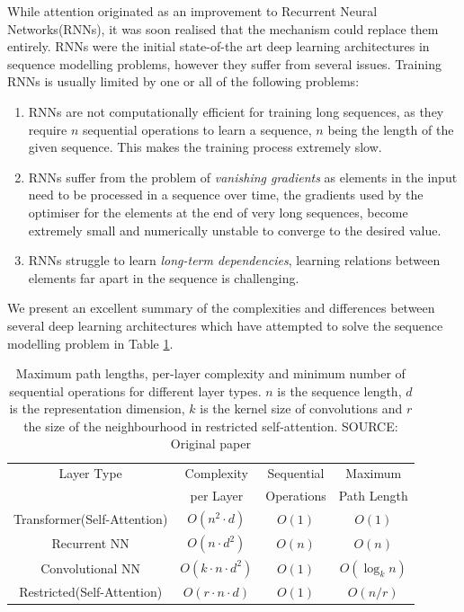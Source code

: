 While attention originated as an improvement to Recurrent Neural Networks(RNNs), it was soon realised that the mechanism could replace them entirely.\cite{vaswaniAttentionAllYou2017}
RNNs were the initial state-of-the art deep learning architectures in sequence modelling problems, however they suffer from several issues. Training RNNs is usually limited by one or all of the following problems:
\begin{enumerate}
\item RNNs are not computationally efficient for training long sequences, as they require $n$ sequential operations to learn a sequence, $n$ being the length of the given sequence. This makes the training process extremely slow.
\item RNNs suffer from the problem of \emph{vanishing gradients} \ie as elements in the input need to be processed in a sequence over time, the gradients used by the optimiser\cite{Robbins2007ASA} for the elements at the end of very long sequences, become extremely small and numerically unstable to converge to the desired value.
\item RNNs struggle to learn \emph{long-term dependencies}, \ie learning relations between elements far apart in the sequence is challenging.
\end{enumerate}

We present an excellent summary of the complexities and differences between several deep learning architectures which have attempted to solve the sequence modelling problem in Table \ref{bg:table1}.

\begin{table}[htbp]
\centering
\begin{tabular}{ c   c   c  c  }
\toprule
Layer Type & Complexity   & Sequential   & Maximum \\
& per Layer & Operations & Path Length \\
\midrule
Transformer(Self-Attention) & $O(n^2 \cdot d)$ & $O(1)$ & $O(1)$ \\
Recurrent NN & $O(n \cdot d^2)$ & $O(n)$ & $O(n)$ \\
Convolutional NN & $O(k \cdot n \cdot d^2)$ & $O(1)$ & $O(\log_{k}{n})$\\
Restricted(Self-Attention) & $O(r \cdot n \cdot d)$ & $O(1)$ & $O(n/r)$\\
\bottomrule
\end{tabular}
\caption{Maximum path lengths, per-layer complexity and minimum number of sequential operations
for different layer types. $n$ is the sequence length, $d$ is the representation dimension, $k$ is the kernel
size of convolutions and $r$ the size of the neighbourhood in restricted self-attention.
SOURCE: Original paper\cite{vaswaniAttentionAllYou2017}}
\label{bg:table1}
\end{table}



